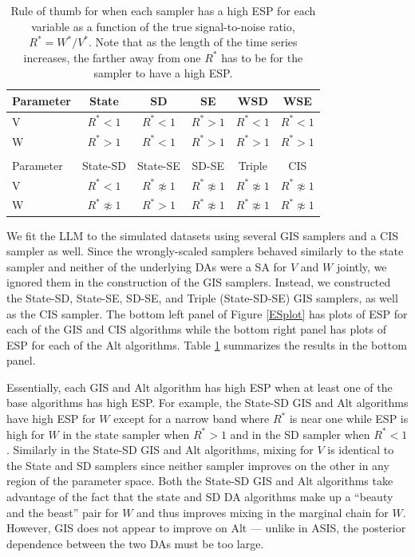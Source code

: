 \documentclass[12pt]{article}
\begin{document}
\begin{table}
  \centering
  \begin{tabular}{lccccc}\hline
    Parameter & State & SD & SE & WSD & WSE \\\hline
    V & $R^* < 1$ & $R^* < 1$ & $R^* > 1$ & $R^* < 1$ & $R^* < 1$\\
    W & $R^* > 1$ & $R^* < 1$ & $R^* > 1$ & $R^* > 1$ & $R^* > 1$ \\
    \hline
      &           &          &           &           &           \\\hline
    Parameter & State-SD        & State-SE       & SD-SE        & Triple            & CIS \\\hline
    V         & $R^* < 1$           & $R^* \not\approx 1$ & $R^* \not\approx 1$ & $R^* \not\approx 1$ & $R^* \not\approx 1$ \\
    W         & $R^* \not\approx 1$ & $R^* > 1$           & $R^* \not\approx 1$ & $R^* \not\approx 1$ & $R^* \not\approx 1$\\\hline
  \end{tabular}
  \caption{Rule of thumb for when each sampler has a high ESP for each variable as a function of the true signal-to-noise ratio, $R^*=W^*/V^*$. Note that as the length of the time series increases, the farther away from one $R^*$ has to be for the sampler to have a high ESP.}
  \label{tab:stnmix}
\end{table}

We fit the LLM to the simulated datasets using several GIS samplers and a CIS sampler as well. Since the wrongly-scaled samplers behaved similarly to the state sampler and neither of the underlying DAs were a SA for $V$ and $W$ jointly, we ignored them in the construction of the GIS samplers. Instead, we constructed the State-SD, State-SE, SD-SE, and Triple (State-SD-SE) GIS samplers, as well as the CIS sampler. The bottom left panel of Figure \ref{ESplot} has plots of ESP for each of the GIS and CIS algorithms while the bottom right panel has plots of ESP for each of the Alt algorithms. Table \ref{tab:stnmix} summarizes the results in the bottom panel.

Essentially, each GIS and Alt algorithm has high ESP when at least one of the base algorithms has high ESP. For example, the State-SD GIS and Alt algorithms have high ESP for $W$ except for a narrow band where $R^*$ is near one while ESP is high for $W$ in the state sampler when $R^*>1$ and in the SD sampler when $R^*<1$. Similarly in the State-SD GIS and Alt algorithms, mixing for $V$ is identical to the State and SD samplers since neither sampler improves on the other in any region of the parameter space. Both the State-SD GIS and Alt algorithms take advantage of the fact that the state and SD DA algorithms make up a ``beauty and the beast'' pair for $W$ and thus improves mixing in the marginal chain for $W$. However, GIS does not appear to improve on Alt --- unlike in ASIS, the posterior dependence between the two DAs must be too large.
\end{document}
